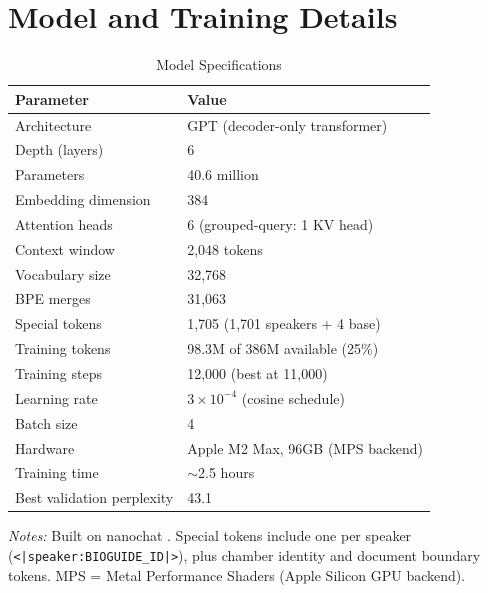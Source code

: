 \documentclass[12pt]{article}
\begin{document}
\newpage
\appendix

\section{Model and Training Details}
\label{app:training}

\begin{table}[H]
\centering
\caption{Model Specifications}
\label{tab:model}
\begin{threeparttable}
\begin{tabular}{ll}
\toprule
Parameter & Value \\
\midrule
Architecture & GPT (decoder-only transformer) \\
Depth (layers) & 6 \\
Parameters & 40.6 million \\
Embedding dimension & 384 \\
Attention heads & 6 (grouped-query: 1 KV head) \\
Context window & 2,048 tokens \\
Vocabulary size & 32,768 \\
\quad BPE merges & 31,063 \\
\quad Special tokens & 1,705 (1,701 speakers + 4 base) \\
\midrule
Training tokens & 98.3M of 386M available (25\%) \\
Training steps & 12,000 (best at 11,000) \\
Learning rate & $3 \times 10^{-4}$ (cosine schedule) \\
Batch size & 4 \\
Hardware & Apple M2 Max, 96GB (MPS backend) \\
Training time & $\sim$2.5 hours \\
Best validation perplexity & 43.1 \\
\bottomrule
\end{tabular}
\begin{tablenotes}[flushleft]
\small
\item \textit{Notes:} Built on nanochat \citep{karpathy2025}. Special tokens include one per speaker (\texttt{<|speaker:BIOGUIDE\_ID|>}), plus chamber identity and document boundary tokens. MPS = Metal Performance Shaders (Apple Silicon GPU backend).
\end{tablenotes}
\end{threeparttable}
\end{table}
\end{document}
